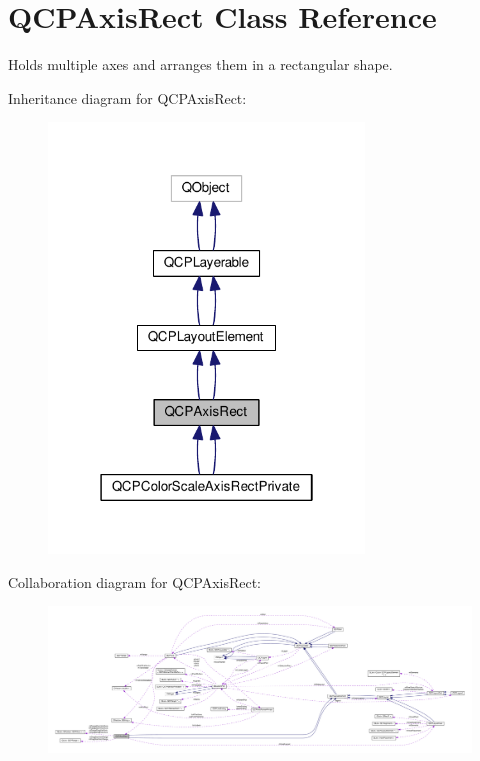 \hypertarget{class_q_c_p_axis_rect}{}\section{Q\+C\+P\+Axis\+Rect Class Reference}
\label{class_q_c_p_axis_rect}


Holds multiple axes and arranges them in a rectangular shape.  




Inheritance diagram for Q\+C\+P\+Axis\+Rect\+:\nopagebreak
\begin{figure}[H]
\begin{center}
\leavevmode
\includegraphics[width=238pt]{class_q_c_p_axis_rect__inherit__graph}
\end{center}
\end{figure}


Collaboration diagram for Q\+C\+P\+Axis\+Rect\+:\nopagebreak
\begin{figure}[H]
\begin{center}
\leavevmode
\includegraphics[width=350pt]{class_q_c_p_axis_rect__coll__graph}
\end{center}
\end{figure}
